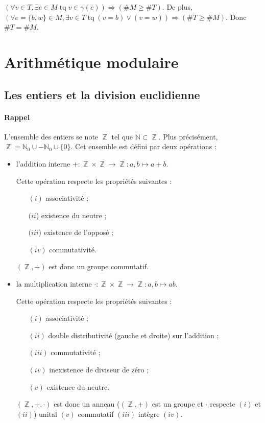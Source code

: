 \documentclass{article}
\DeclareMathOperator{\tq}{\text{ tq }}
\DeclareMathOperator{\Z}{\mathbb Z}
\begin{document}
			$(\forall v \in T, \exists e \in M \tq v \in \gamma(e)) \Rightarrow (\#M \geq \#T)$. De plus, $(\forall e = \{b, w\} \in M,
			\exists v \in T \tq (v = b) \lor (v = w)) \Rightarrow (\#T \geq \#M)$. Donc $\#T = \#M$.

	\section{Arithmétique modulaire}

		\subsection{Les entiers et la division euclidienne}

			\paragraph{Rappel} L'ensemble des entiers se note $\Z$ tel que $\mathbb N \subset \Z$. Plus précisément,
			$\Z = \mathbb N_0 \cup -\mathbb N_0 \cup \{0\}$. Cet ensemble est défini par deux opérations :

			\begin{itemize}
				\item l'addition interne $+ : \Z \times \Z \to \Z : a, b \mapsto a+b$.

					  Cette opération respecte les propriétés suivantes :

					  \begin{itemize}
						\item[$(i)$] associativité ;
						\item[$(ii$)] existence du neutre ;
						\item[$(iii$)] existence de l'opposé ;
						\item[$(iv)$] commutativité.
					  \end{itemize}

					  $(\Z, +)$ est donc un groupe commutatif.
				\item la multiplication interne $\cdot : \Z \times \Z \to \Z : a, b \mapsto ab$.

					  Cette opération respecte les propriétés suivantes :

					  \begin{itemize}
						\item[$(i)$] associativité ;
						\item[$(ii)$] double distributivité (gauche et droite) sur l'addition ;
						\item[$(iii)$] commutativité ;
						\item[$(iv)$] inexistence de diviseur de zéro ;
						\item[$(v)$] existence du neutre.
					  \end{itemize}

					  $(\Z, +, \cdot)$ est donc un anneau ($(\Z, +)$ est un groupe et $\cdot$ respecte $(i)$ et $(ii)$) unital $(v)$
					  commutatif $(iii)$ intègre $(iv)$.
			\end{itemize}
\end{document}
